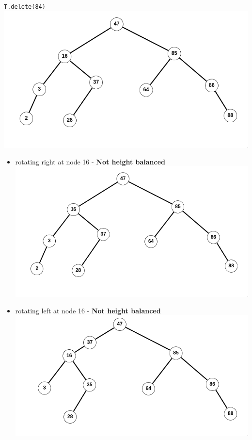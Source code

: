\documentclass[12pt,twoside]{article}
\begin{document}
\begin{problems}
\begin{problemparts}
{\tt T.delete(84)}\\
\includegraphics[width=1.0\textwidth]{./trees/img5.png}
\problempart %
\begin{itemize}
  \item rotating right at node 16 - \textbf{Not height balanced} \\
\includegraphics[width=1.0\textwidth]{./trees/img5.png}
  \item rotating left at node 16 - \textbf{Not height balanced} \\
\includegraphics[width=1.0\textwidth]{./trees/img6.png} 

\end{itemize}
\end{problemparts}
\end{problems}
\end{document}
